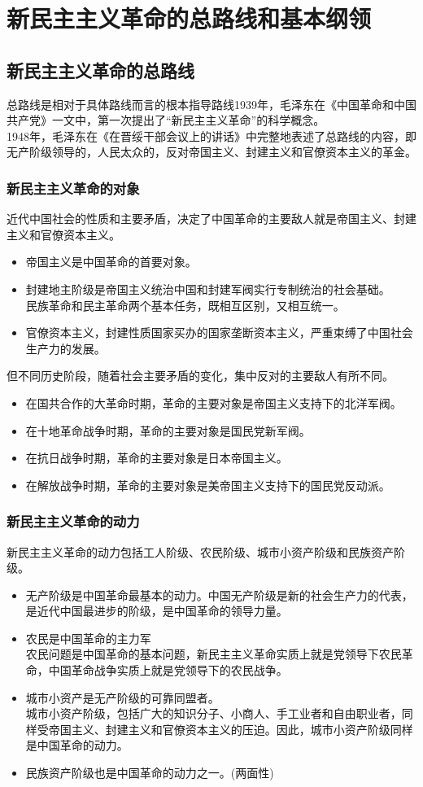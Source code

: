 \section{新民主主义革命的总路线和基本纲领}
\subsection{新民主主义革命的总路线}
总路线是相对于具体路线而言的根本指导路线1939年，毛泽东在《中国革命和中国共产党》一文中，第一次提出了“新民主主义革命”的科学概念。\\ 
1948年，毛泽东在《在晋绥干部会议上的讲话》中完整地表述了总路线的内容，即无产阶级领导的，人民太众的，反对帝国主义、封建主义和官僚资本主义的革金。
\subsubsection{新民主主义革命的对象}
近代中国社会的性质和主要矛盾，决定了中国革命的主要敌人就是帝国主义、封建主义和官僚资本主义。
\begin{itemize}
	\item 帝国主义是中国革命的首要对象。
	\item 封建地主阶级是帝国主义统治中国和封建军阀实行专制统治的社会基础。\\
	民族革命和民主革命两个基本任务，既相互区别，又相互统一。
	\item 官僚资本主义，封建性质国家买办的国家垄断资本主义，严重束缚了中国社会生产力的发展。
\end{itemize}
但不同历史阶段，随着社会主要矛盾的变化，集中反对的主要敌人有所不同。
\begin{itemize}
	\item 在国共合作的大革命时期，革命的主要对象是帝国主义支持下的北洋军阀。
	\item 在十地革命战争时期，革命的主要对象是国民党新军阀。
	\item 在抗日战争时期，革命的主要对象是日本帝国主义。
	\item 在解放战争时期，革命的主要对象是美帝国主义支持下的国民党反动派。
\end{itemize}
\subsubsection{新民主主义革命的动力}
新民主主义革命的动力包括工人阶级、农民阶级、城市小资产阶级和民族资产阶级。
\begin{itemize}
	\item 无产阶级是中国革命最基本的动力。中国无产阶级是新的社会生产力的代表，是近代中国最进步的阶级，是中国革命的领导力量。
	\item 农民是中国革命的主力军\\
	农民问题是中国革命的基本问题，新民主主义革命实质上就是党领导下农民革命，中国革命战争实质上就是党领导下的农民战争。
	\item 城市小资产是无产阶级的可靠同盟者。
	\\城市小资产阶级，包括广大的知识分子、小商人、手工业者和自由职业者，同样受帝国主义、封建主义和官僚资本主义的压迫。因此，城市小资产阶级同样是中国革命的动力。
	\item 民族资产阶级也是中国革命的动力之一。(两面性)
\end{itemize}
